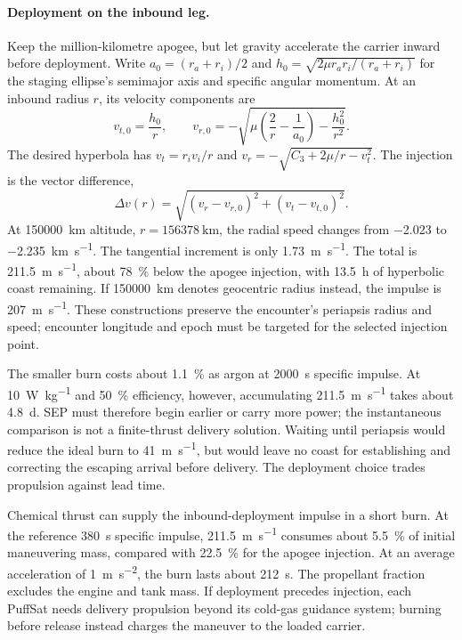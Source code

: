 \documentclass{article}
\newcommand{\deltav}{\Delta v}
\begin{document}
\paragraph{Deployment on the inbound leg.}
Keep the million-kilometre apogee, but let gravity accelerate the carrier inward before deployment. Write $a_0=(r_a+r_i)/2$ and $h_0=\sqrt{2\mu r_a r_i/(r_a+r_i)}$ for the staging ellipse's semimajor axis and specific angular momentum. At an inbound radius $r$, its velocity components are
\begin{equation}
v_{t,0}=\frac{h_0}{r}, \qquad
v_{r,0}=-\sqrt{\mu\left(\frac{2}{r}-\frac{1}{a_0}\right)-\frac{h_0^2}{r^2}}.
\end{equation}
The desired hyperbola has $v_t=r_i v_i/r$ and $v_r=-\sqrt{C_3+2\mu/r-v_t^2}$. The injection is the vector difference,
\begin{equation}
\deltav(r)=\sqrt{(v_r-v_{r,0})^2+(v_t-v_{t,0})^2}.
\end{equation}
At \SI{150000}{\kilo\meter} altitude, $r=\SI{156378}{\kilo\meter}$, the radial speed changes from \SI{-2.023}{} to \SI{-2.235}{\kilo\meter\per\second}. The tangential increment is only \SI{1.73}{\meter\per\second}. The total is \SI{211.5}{\meter\per\second}, about \SI{78}{\percent} below the apogee injection, with \SI{13.5}{\hour} of hyperbolic coast remaining. If \SI{150000}{\kilo\meter} denotes geocentric radius instead, the impulse is \SI{207}{\meter\per\second}. These constructions preserve the encounter's periapsis radius and speed; encounter longitude and epoch must be targeted for the selected injection point.

The smaller burn costs about \SI{1.1}{\percent} as argon at \SI{2000}{\second} specific impulse. At \SI{10}{\watt\per\kilogram} and \SI{50}{\percent} efficiency, however, accumulating \SI{211.5}{\meter\per\second} takes about \SI{4.8}{\day}. SEP must therefore begin earlier or carry more power; the instantaneous comparison is not a finite-thrust delivery solution. Waiting until periapsis would reduce the ideal burn to \SI{41}{\meter\per\second}, but would leave no coast for establishing and correcting the escaping arrival before delivery. The deployment choice trades propulsion against lead time.

Chemical thrust can supply the inbound-deployment impulse in a short burn. At the reference \SI{380}{\second} specific impulse, \SI{211.5}{\meter\per\second} consumes about \SI{5.5}{\percent} of initial maneuvering mass, compared with \SI{22.5}{\percent} for the apogee injection. At an average acceleration of \SI{1}{\meter\per\second\squared}, the burn lasts about \SI{212}{\second}. The propellant fraction excludes the engine and tank mass. If deployment precedes injection, each PuffSat needs delivery propulsion beyond its cold-gas guidance system; burning before release instead charges the maneuver to the loaded carrier.
\end{document}
